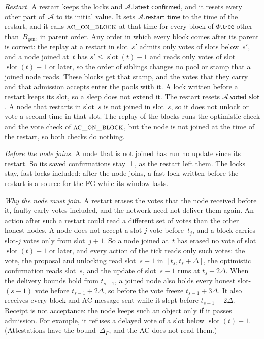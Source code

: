 \documentclass{article}
\newcommand{\genesis}{B_{\mathrm{gen}}}
\newcommand{\slot}{\operatorname{slot}}
\newcommand{\AC}{\mathcal A}
\newcommand{\Fr}{\Phi}
\newcommand{\tree}{\mathsf{tree}}
\newcommand{\latestConfirmed}{\mathsf{latest\_confirmed}}
\newcommand{\restartTime}{\mathsf{restart\_time}}
\newcommand{\votedSlot}{\mathsf{voted\_slot}}
\begin{document}
\emph{Restart.}  A restart keeps the locks and $\AC.\latestConfirmed$, and it resets
every other part of~$\AC$ to its initial value.  It sets
$\AC.\restartTime$ to the time of the restart, and it calls
$\Call{ac\_on\_block}{}$ at that time for every block of $\Fr.\tree$ other
than~$\genesis$, in parent order.  Any order in which every block comes after
its parent is correct: the replay at a restart in slot~$s'$ admits only votes
of slots below~$s'$, and a node joined at~$t$ has $s'\leq\slot(t)-1$ and reads
only votes of slot $\slot(t)-1$ or later, so the order of siblings changes no
pool or stamp that a joined node reads.  These blocks get that stamp, and the
votes that they carry and that admission accepts enter the pools with it.
A lock written before a restart keeps its slot, so a sleep does not
extend it.  The restart resets $\AC.\votedSlot$.
A node that restarts in slot~$s$ is not joined in slot~$s$, so it does not
unlock or vote a second time in that slot.  The replay of the blocks runs
the optimistic check and the vote check of $\Call{ac\_on\_block}{}$, but
the node is not joined at the time of the restart, so both checks do
nothing.

\emph{Before the node joins.}  A node that is not joined has run no
update since its restart.  So its saved confirmations stay~$\bot$, as the
restart left them.  The locks stay, fast locks included: after the node
joins, a fast lock written before the restart is a source for the FG
while its window lasts.

\emph{Why the node must join.}  A restart erases the votes that the node
received before it, faulty early votes included, and the network need not
deliver them again.  An action after such a restart could read a different
set of votes than the other honest nodes.  A node does not accept a
slot-$j$ vote before~$t_j$, and a block carries slot-$j$ votes only from
slot~$j+1$.  So a node joined at~$t$ has erased no vote of slot
$\slot(t)-1$ or later, and every action of the tick reads only such votes:
the vote, the proposal and unlocking read slot~$s-1$ in
$[t_s,t_s+\Delta]$, the optimistic confirmation reads slot~$s$, and the
update of slot~$s-1$ runs at $t_s+2\Delta$.  When the
delivery bounds hold from $t_{s-1}$, a joined node also holds every
honest slot-$(s-1)$ vote before $t_{s-1}+2\Delta$, so before the vote freeze
$t_{s-1}+3\Delta$.  It also receives every block and AC message sent while
it slept before $t_{s-1}+2\Delta$.  Receipt is not acceptance: the node
keeps such an object only if it passes admission.  For example, it refuses
a delayed vote of a slot below $\slot(t)-1$.  (Attestations have the
bound~$\Delta_F$, and the AC does not read them.)
\end{document}

